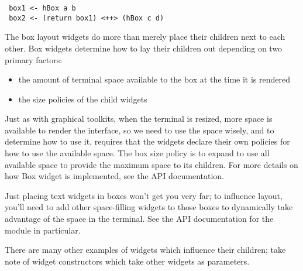 \begin{verbatim}
 box1 <- hBox a b
 box2 <- (return box1) <++> (hBox c d)
\end{verbatim}

The box layout widgets do more than merely place their children next to
each other.  Box widgets determine how to lay their children out
depending on two primary factors:

\begin{itemize}
\item the amount of terminal space available to the box at the time it
      is rendered
\item the size policies of the child widgets
\end{itemize}

Just as with graphical toolkits, when the terminal is resized, more
space is available to render the interface, so we need to use the
space wisely, and to determine how to use it,  requires
that the widgets declare their own policies for how to use the
available space.  The box size policy is to expand to use all
available space to provide the maximum space to its children.  For
more details on how Box widget is implemented, see the API
documentation.

Just placing text widgets in boxes won't get you very far; to
influence layout, you'll need to add other space-filling widgets to
those boxes to dynamically take advantage of the space in the
terminal.  See the API documentation for the  module in
particular.

There are many other examples of widgets which influence their children;
take note of widget constructors which take other widgets as parameters.
